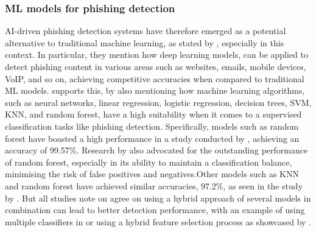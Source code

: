 
\subsubsection*{ML models for phishing detection}
AI-driven phishing detection systems have therefore emerged as a potential alternative to traditional machine learning, as stated by \cite{do2022deep}, especially in this context. In particular, they mention how deep learning models, can be applied to detect phishing content in various areas such as websites, emails, mobile devices, VoIP, and so on, achieving competitive accuracies when compared to traditional ML models. \cite{tang2021survey} supports this, by also mentioning how machine learning algorithms, such as neural networks, linear regression, logistic regression, decision trees, SVM, KNN, and random forest, have a high suitability when it comes to a supervised classification tasks like phishing detection. Specifically, models such as random forest have boasted a high performance in a study conducted by \cite{gupta2021novel}, achieving an accuracy of 99.57\%. Research by \citep{kapoor2024comparative} also advocated for the outstanding performance of random forest, especially in its ability to maintain a classification balance, minimising the risk of false positives and negatives.Other models such as KNN and random forest have achieved similar accuracies, 97.2\%, as seen in the study by \cite{zamir2020phishing}. But all studies note on agree on using a hybrid approach of several models in combination can lead to better detection performance, with an example of using multiple classifiers in \cite{alsariera2020ai} or using a hybrid feature selection process as showcased by \cite{hamid2013using}.
